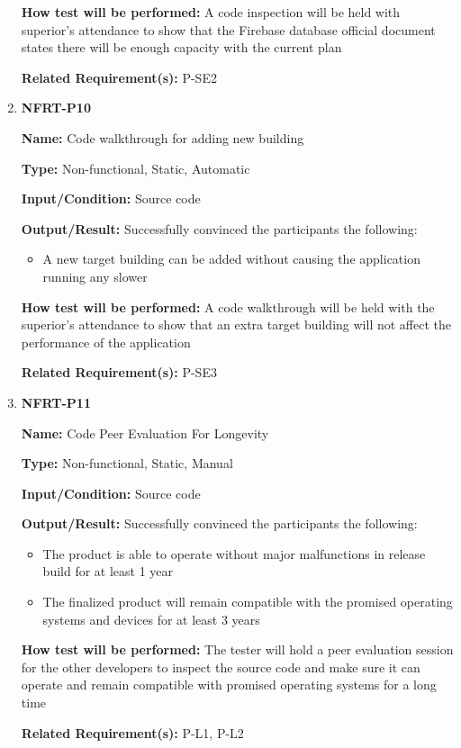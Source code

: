 \documentclass[12pt, titlepage]{article}
\begin{document}
\begin{enumerate}
\textbf{How test will be performed:} A code inspection will be held with superior's attendance to show that the Firebase database official document states there will be enough capacity with the current plan

\textbf{Related Requirement(s):} P-SE2

\item{\textbf{NFRT-P10}}

\textbf{Name:} Code walkthrough for adding new building

\textbf{Type:} Non-functional, Static, Automatic

\textbf{Input/Condition:} Source code

\textbf{Output/Result:} Successfully convinced the participants the following:
\begin{itemize}
\item A new target building can be added without causing the application running any slower
\end{itemize}

\textbf{How test will be performed:} A code walkthrough will be held with the superior's attendance to show that an extra target building will not affect the performance of the application

\textbf{Related Requirement(s):} P-SE3

\item{\textbf{NFRT-P11}}

\textbf{Name:} Code Peer Evaluation For Longevity

\textbf{Type:} Non-functional, Static, Manual

\textbf{Input/Condition:} Source code

\textbf{Output/Result:} Successfully convinced the participants the following:
\begin{itemize} 
  \item The product is able to operate without major malfunctions in release build for at least 1 year
  \item The finalized product will remain compatible with the promised operating systems and devices for at least 3 years
\end{itemize}

\textbf{How test will be performed:} The tester will hold a peer evaluation session for the other developers to inspect the source code and make sure it can operate and remain compatible with promised operating systems for a long time

\textbf{Related Requirement(s):} P-L1, P-L2
\end{enumerate}
\end{document}
